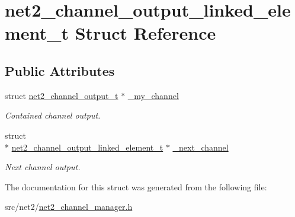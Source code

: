 \hypertarget{structnet2__channel__output__linked__element__t}{\section{net2\-\_\-channel\-\_\-output\-\_\-linked\-\_\-element\-\_\-t Struct Reference}
\label{structnet2__channel__output__linked__element__t}
}
\subsection*{Public Attributes}
\begin{DoxyCompactItemize}
\item 
\hypertarget{structnet2__channel__output__linked__element__t_a343a53b3f9c63bb64b2d478421aae3cf}{struct \hyperlink{structnet2__channel__output__t}{net2\-\_\-channel\-\_\-output\-\_\-t} $\ast$ \hyperlink{structnet2__channel__output__linked__element__t_a343a53b3f9c63bb64b2d478421aae3cf}{\-\_\-my\-\_\-channel}}\label{structnet2__channel__output__linked__element__t_a343a53b3f9c63bb64b2d478421aae3cf}

\begin{DoxyCompactList}\small\item\em Contained channel output. \end{DoxyCompactList}\item 
\hypertarget{structnet2__channel__output__linked__element__t_a433cc35e25167e850e0d04c222b75a44}{struct \\*
\hyperlink{structnet2__channel__output__linked__element__t}{net2\-\_\-channel\-\_\-output\-\_\-linked\-\_\-element\-\_\-t} $\ast$ \hyperlink{structnet2__channel__output__linked__element__t_a433cc35e25167e850e0d04c222b75a44}{\-\_\-next\-\_\-channel}}\label{structnet2__channel__output__linked__element__t_a433cc35e25167e850e0d04c222b75a44}

\begin{DoxyCompactList}\small\item\em Next channel output. \end{DoxyCompactList}\end{DoxyCompactItemize}


The documentation for this struct was generated from the following file\-:\begin{DoxyCompactItemize}
\item 
src/net2/\hyperlink{net2__channel__manager_8h}{net2\-\_\-channel\-\_\-manager.\-h}\end{DoxyCompactItemize}
